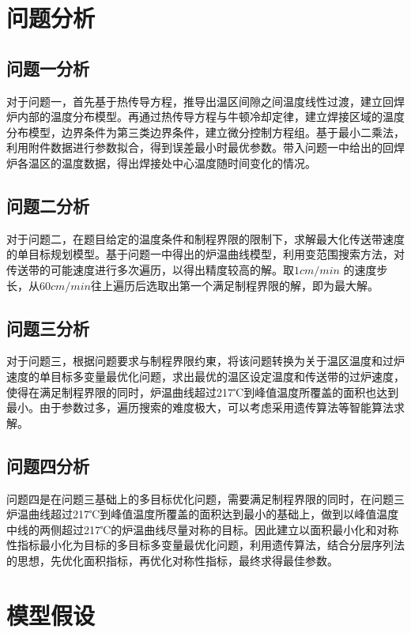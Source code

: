 \documentclass[withoutpreface,bwprint]{cumcmthesis} %
\begin{document}
	
	\section{问题分析}
		\subsection{问题一分析}
		对于问题一，首先基于热传导方程，推导出温区间隙之间温度线性过渡，建立回焊炉内部的温度分布模型。再通过热传导方程与牛顿冷却定律，建立焊接区域的温度分布模型，边界条件为第三类边界条件，建立微分控制方程组。基于最小二乘法，利用附件数据进行参数拟合，得到误差最小时最优参数。带入问题一中给出的回焊炉各温区的温度数据，得出焊接处中心温度随时间变化的情况。
		
		\subsection{问题二分析}	
		对于问题二，在题目给定的温度条件和制程界限的限制下，求解最大化传送带速度的单目标规划模型。基于问题一中得出的炉温曲线模型，利用变范围搜索方法，对传送带的可能速度进行多次遍历，以得出精度较高的解。取$1cm/min$ 的速度步长，从$60cm/min$往上遍历后选取出第一个满足制程界限的解，即为最大解。
		
		\subsection{问题三分析}
		对于问题三，根据问题要求与制程界限约東，将该问题转换为关于温区温度和过炉速度的单目标多变量最优化问题，求出最优的温区设定温度和传送带的过炉速度，使得在满足制程界限的同时，炉温曲线超过217℃到峰值温度所覆盖的面积也达到最小。由于参数过多，遍历搜索的难度极大，可以考虑采用遗传算法等智能算法求解。
		
		\subsection{问题四分析}
		问题四是在问题三基础上的多目标优化问题，需要满足制程界限的同时，在问题三炉温曲线超过217℃到峰值温度所覆盖的面积达到最小的基础上，做到以峰值温度中线的两侧超过217℃的炉温曲线尽量对称的目标。因此建立以面积最小化和对称性指标最小化为目标的多目标多变量最优化问题，利用遗传算法，结合分层序列法的思想，先优化面积指标，再优化对称性指标，最终求得最佳参数。
		
	
	
	\section{模型假设}
	
\end{document}

